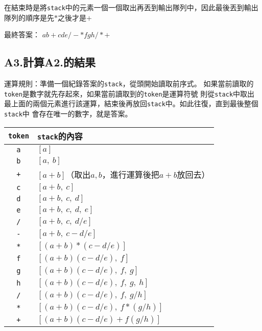 \documentclass[12pt,a4paper]{article}
\begin{document}
在結束時是將\texttt{stack}中的元素一個一個取出再丟到輸出隊列中，因此最後丟到輸出隊列的順序是先$*$之後才是$+$


最終答案：
$
a b + c d e / - * f g h / * +
$

\newpage
\subsection*{A3.計算A2.的結果}

運算規則：準備一個紀錄答案的\texttt{stack}，從頭開始讀取前序式。
如果當前讀取的\texttt{token}是數字就先存起來，如果當前讀取到的\texttt{token}是運算符號
則從\texttt{stack}中取出最上面的兩個元素進行該運算，結束後再放回\texttt{stack}中。如此往復，直到最後整個\texttt{stack}中
會存在唯一的數字，就是答案。

\begin{center}
\begin{tabular}{|c| p{10cm}|}
\hline
\texttt{token} & \texttt{stack}的內容 \\
\hline
\texttt{a} & $[a]$ \\
\texttt{b} & $[a,\ b]$ \\
\texttt{+} & $[a + b]$（取出$a, b$，進行運算後把$a+b$放回去） \\
\texttt{c} & $[a + b,\ c]$ \\
\texttt{d} & $[a + b,\ c,\ d]$ \\
\texttt{e} & $[a + b,\ c,\ d,\ e]$ \\
\texttt{/} & $[a + b,\ c,\ d / e]$ \\
\texttt{-} & $[a + b,\ c - d / e]$ \\
\texttt{*} & $[(a + b) * (c - d / e)]$ \\
\texttt{f} & $[(a + b)(c - d / e),\ f]$ \\
\texttt{g} & $[(a + b)(c - d / e),\ f,\ g]$ \\
\texttt{h} & $[(a + b)(c - d / e),\ f,\ g,\ h]$ \\
\texttt{/} & $[(a + b)(c - d / e),\ f,\ g / h]$ \\
\texttt{*} & $[(a + b)(c - d / e),\ f * (g / h)]$ \\
\texttt{+} & $[(a + b)(c - d / e) + f (g / h)]$ \\
\hline
\end{tabular}    
\end{center}
\end{document}
